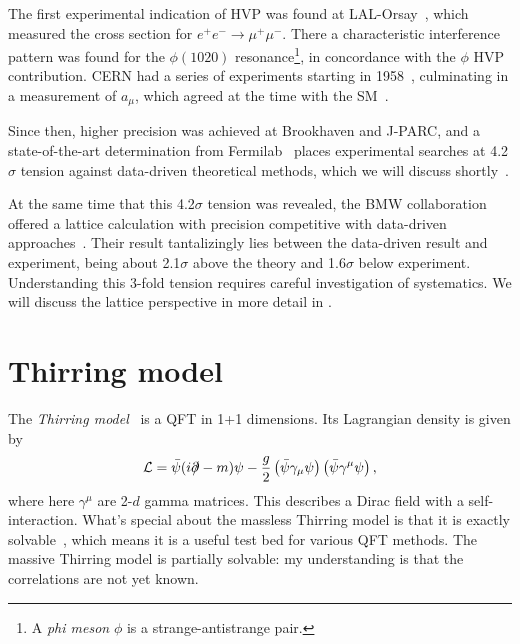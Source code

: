 The first experimental indication of HVP was found at 
LAL-Orsay~\cite{augustin_evidence_1973},
which measured the cross section for $e^+e^-\to\mu^+\mu^-$.
There a characteristic interference pattern was found for
the $\phi(1020)$ resonance\footnote{A {\it phi meson} $\phi$
is a strange-antistrange pair.}, in concordance with the
$\phi$ HVP contribution. CERN had a series of experiments
starting in 
1958~\cite{charpak_measurement_1961,bailey_precise_1971,bailey_anomalous_1977}, 
culminating in a measurement of $a_\mu$, which agreed at the time with the 
SM~\cite{calmet_anomalous_1977}.


Since then, higher precision was achieved at Brookhaven
and J-PARC, and a state-of-the-art determination from 
Fermilab~\cite{abi_measurement_2021}
places experimental searches at 4.2$\sigma$ tension
against data-driven theoretical methods,
which we will discuss shortly~\cite{aoyama_anomalous_2020}.


At the same time that this 4.2$\sigma$ tension was revealed,
the BMW collaboration offered a lattice calculation with precision competitive
with data-driven approaches~\cite{borsanyi_leading_2021}.
Their result tantalizingly lies between the data-driven result and experiment,
being about 2.1$\sigma$ above the theory and 1.6$\sigma$ below experiment.
Understanding this 3-fold tension requires careful investigation of
systematics. We will discuss the lattice perspective
in more detail in . 



\section{Thirring model}\label{sec:Thirring}

The {\it Thirring model}~\cite{thirring_soluble_1958} is a QFT in 1+1 dimensions.
Its Lagrangian density is given by
\begin{equation}
  \mathcal{L}=\bar{\psi}(i\partial\!\!\!/-m)\psi -\frac{g}{2}
         \left(\bar{\psi}\gamma_\mu\psi\right) \left(\bar{\psi}\gamma^\mu
\psi\right),
\end{equation}
where here $\gamma^\mu$ are 2-$d$ gamma matrices.
This describes a Dirac field with a self-interaction.
What's special about the massless Thirring model is that it is 
exactly solvable~\cite{johnson_solution_1961,hagen_new_1967,klaiber_1968}, 
which means it is a useful test bed for various QFT methods.
The massive Thirring model is partially solvable: my understanding is that the
correlations are not yet known.

